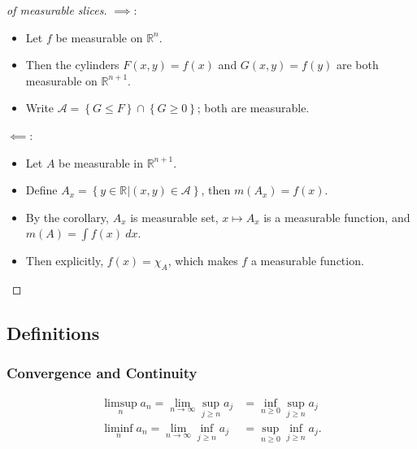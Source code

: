 \begin{proof}[of measurable slices]

\envlist

\(\implies\):

\begin{itemize}
\tightlist
\item
  Let \(f\) be measurable on \({\mathbb{R}}^n\).
\item
  Then the cylinders \(F(x, y) = f(x)\) and \(G(x, y) = f(y)\) are both
  measurable on \({\mathbb{R}}^{n+1}\).
\item
  Write
  \(\mathcal{A} = \left\{{G \leq F}\right\} \cap\left\{{G \geq 0}\right\}\);
  both are measurable.
\end{itemize}

\(\impliedby\):

\begin{itemize}
\tightlist
\item
  Let \(A\) be measurable in \({\mathbb{R}}^{n+1}\).
\item
  Define
  \(A_x = \left\{{y\in {\mathbb{R}}\mathrel{\Big|}(x, y) \in \mathcal{A}}\right\}\),
  then \(m(A_x) = f(x)\).
\item
  By the corollary, \(A_x\) is measurable set, \(x \mapsto A_x\) is a
  measurable function, and \(m(A) = \int f(x) ~dx\).
\item
  Then explicitly, \(f(x) = \chi_{A}\), which makes \(f\) a measurable
  function.
\end{itemize}

\end{proof}

\hypertarget{definitions}{%
\subsection{Definitions}\label{definitions}}

\hypertarget{convergence-and-continuity}{%
\subsubsection{Convergence and
Continuity}\label{convergence-and-continuity}}

\begin{definition}

\begin{align*}  
\limsup_n a_n = \lim_{n\to \infty} \sup_{j\geq n} a_j &= \inf_{n\geq 0} \sup_{j\geq n} a_j \\ 
\liminf_n a_n = \lim_{n\to \infty} \inf_{j\geq n} a_j &= \sup_{n\geq 0} \inf_{j\geq n} a_j
.\end{align*}

\end{definition}

